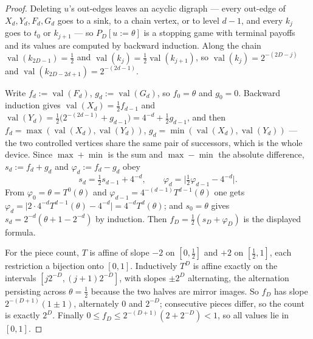 \documentclass[11pt]{article}
\theoremstyle{plain}
\theoremstyle{definition}
\DeclareMathOperator{\val}{val}
\begin{document}
\begin{proof}
Deleting $u$'s out-edges leaves an acyclic digraph --- every out-edge of
$X_d,Y_d,F_d,G_d$ goes to a sink, to a chain vertex, or to level $d-1$, and
every $k_j$ goes to $t_0$ or $k_{j+1}$ --- so $P_D[u{:=}\theta]$ is a stopping
game with terminal payoffs and its values are computed by backward induction.
Along the chain $\val(k_{2D-1})=\tfrac12$ and $\val(k_j)=\tfrac12\val(k_{j+1})$,
so $\val(k_j)=2^{-(2D-j)}$ and $\val(k_{2D-2d+1})=2^{-(2d-1)}$.

Write $f_d:=\val(F_d)$, $g_d:=\val(G_d)$, so $f_0=\theta$ and $g_0=0$. Backward
induction gives $\val(X_d)=\tfrac12f_{d-1}$ and
$\val(Y_d)=\tfrac12\bigl(2^{-(2d-1)}+g_{d-1}\bigr)=4^{-d}+\tfrac12g_{d-1}$, and
then $f_d=\max(\val(X_d),\val(Y_d))$, $g_d=\min(\val(X_d),\val(Y_d))$ --- the
two controlled vertices share the same pair of successors, which is the whole
device. Since $\max+\min$ is the sum and $\max-\min$ the absolute difference,
$s_d:=f_d+g_d$ and $\varphi_d:=f_d-g_d$ obey
\[
  s_d=\tfrac12 s_{d-1}+4^{-d},\qquad
  \varphi_d=\bigl|\tfrac12\varphi_{d-1}-4^{-d}\bigr| .
\]
From $\varphi_0=\theta=T^{0}(\theta)$ and $\varphi_{d-1}=4^{-(d-1)}T^{d-1}(\theta)$
one gets
$\varphi_d=\bigl|2\cdot4^{-d}T^{d-1}(\theta)-4^{-d}\bigr|=4^{-d}T^{d}(\theta)$;
and $s_0=\theta$ gives $s_d=2^{-d}(\theta+1-2^{-d})$ by induction. Then
$f_D=\tfrac12(s_D+\varphi_D)$ is the displayed formula.

For the piece count, $T$ is affine of slope $-2$ on $[0,\tfrac12]$ and $+2$ on
$[\tfrac12,1]$, each restriction a bijection onto $[0,1]$. Inductively $T^{D}$
is affine exactly on the intervals $[j2^{-D},(j+1)2^{-D}]$, with slopes
$\pm2^{D}$ alternating, the alternation persisting across $\theta=\tfrac12$
because the two halves are mirror images. So $f_D$ has slope
$2^{-(D+1)}(1\pm1)$, alternately $0$ and $2^{-D}$; consecutive pieces differ, so
the count is exactly $2^{D}$. Finally $0\le f_D\le2^{-(D+1)}(2+2^{-D})<1$, so
all values lie in $[0,1]$.
\end{proof}
\end{document}
